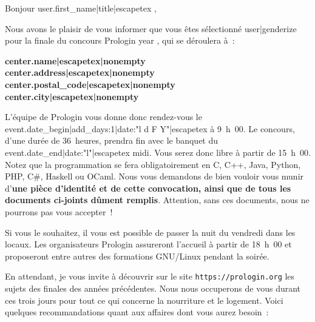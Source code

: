 \documentclass[a4paper,11pt]{article}
\begin{document}
\def\objet{Convocation à la finale Prologin {{ year }} }

{%
{%

\def\destinataire{%
{{ user.get_full_name|title|escapetex|nonempty }}\\
{{ user.address|escapetex|nonempty }}\\
{{ user.postal_code|escapetex|nonempty }} {{ user.city|escapetex|nonempty }}\\
{{ user.country|escapetex|nonempty }} %
}
\header

Bonjour {{ user.first_name|title|escapetex }},

Nous avons le plaisir de vous informer que vous êtes
sélectionné{{ user|genderize }}
pour la finale du concours Prologin {{ year }}, qui se déroulera à~:

{\par\smallskip\noindent\centering
\begin{minipage}{0.5\textwidth}
\textbf{%
{{ center.name|escapetex|nonempty }}%
}\\
\textbf{%
{{ center.address|escapetex|nonempty }}%
}\\
\textbf{%
{{ center.postal_code|escapetex|nonempty }} {{ center.city|escapetex|nonempty }}%
}
\end{minipage}
\par\smallskip}

L'équipe de Prologin vous donne donc rendez-vous le {{ event.date_begin|add_days:1|date:"l d F Y"|escapetex }}
à 9~h~00. Le concours, d'une durée de 36~heures, prendra fin avec le banquet du
{{ event.date_end|date:"l"|escapetex }} midi. Vous serez donc libre à partir de 15~h~00. Notez que la
programmation se fera obligatoirement en C, C++, Java, Python, PHP, C\#,
Haskell ou OCaml. Nous vous demandons de bien vouloir vous munir d'\textbf{une
pièce d'identité et de cette convocation, ainsi que de tous les documents
ci-joints dûment remplis}. Attention, sans ces documents, nous ne pourrons pas
vous accepter~!

Si vous le souhaitez, il vous est possible de passer la nuit du vendredi dans
les locaux. Les organisateurs Prologin assureront l'accueil à partir de 18~h~00
et proposeront entre autres des formations GNU/Linux pendant la soirée.

En attendant, je vous invite à découvrir sur le site
\texttt{https://prologin.org} les sujets des finales des années précédentes.
Nous nous occuperons de vous durant ces trois jours pour tout ce qui concerne
la nourriture et le logement. Voici quelques recommandations quant aux affaires
dont vous aurez besoin~:

}}
\end{document}
